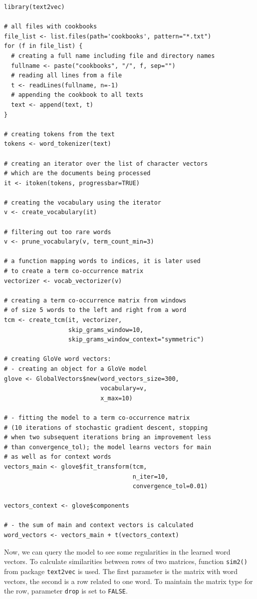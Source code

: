 \documentclass[11pt,openany,executivepaper]{book}
\begin{document}
\begin{verbatim}
library(text2vec)

# all files with cookbooks
file_list <- list.files(path='cookbooks', pattern="*.txt")
for (f in file_list) {
  # creating a full name including file and directory names
  fullname <- paste("cookbooks", "/", f, sep="")
  # reading all lines from a file
  t <- readLines(fullname, n=-1)
  # appending the cookbook to all texts
  text <- append(text, t)
}

# creating tokens from the text
tokens <- word_tokenizer(text)

# creating an iterator over the list of character vectors
# which are the documents being processed
it <- itoken(tokens, progressbar=TRUE)

# creating the vocabulary using the iterator
v <- create_vocabulary(it)

# filtering out too rare words
v <- prune_vocabulary(v, term_count_min=3)

# a function mapping words to indices, it is later used
# to create a term co-occurrence matrix
vectorizer <- vocab_vectorizer(v)

# creating a term co-occurrence matrix from windows
# of size 5 words to the left and right from a word
tcm <- create_tcm(it, vectorizer,
                  skip_grams_window=10,
                  skip_grams_window_context="symmetric")

# creating GloVe word vectors:
# - creating an object for a GloVe model
glove <- GlobalVectors$new(word_vectors_size=300,
                           vocabulary=v,
                           x_max=10)

# - fitting the model to a term co-occurrence matrix
# (10 iterations of stochastic gradient descent, stopping
# when two subsequent iterations bring an improvement less
# than convergence_tol); the model learns vectors for main
# as well as for context words
vectors_main <- glove$fit_transform(tcm,
                                    n_iter=10,
                                    convergence_tol=0.01)

vectors_context <- glove$components

# - the sum of main and context vectors is calculated
word_vectors <- vectors_main + t(vectors_context)
\end{verbatim}

Now, we can query the model to see some regularities in the learned word
vectors. To calculate similarities between rows of two matrices, function \texttt{sim2()} from package \texttt{text2vec} is used. The first parameter is the matrix with word vectors, the second is a row related to one word. To maintain the matrix type for
the row, parameter \texttt{drop} is set to \texttt{FALSE}.
\end{document}
